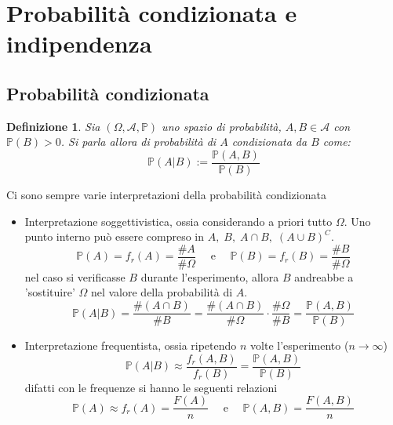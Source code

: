 \documentclass[a4paper,12pt]{article}
\theoremstyle{break}
\newtheorem{definition}{Definizione}[section]
\numberwithin{equation}{section}
\begin{document}
\section{Probabilità condizionata e indipendenza}
\subsection{Probabilità condizionata}
\begin{definition}
  Sia \((\Omega, \mathcal{A}, \mathbb{P})\) uno spazio di probabilità, \(A, B \in \mathcal{A}\) con \(\mathbb{P}(B) > 0\). Si parla allora di probabilità di \(A\) condizionata da \(B\) come: 
  \[
    \mathbb{P}(A|B) := \frac{\mathbb{P}(A,B)}{\mathbb{P}(B)}
  \]
\end{definition}
Ci sono sempre varie interpretazioni della probabilità condizionata
\begin{itemize}
  \item Interpretazione soggettivistica, ossia considerando a priori tutto \(\Omega\). Uno punto interno può essere compreso in \(A, \; B, \; A \cap B, \; (A \cup B)^C\). 
  \[
    \mathbb{P}(A) = f_r (A) = \frac{\# A}{\# \Omega} \quad \mbox{ e } \quad \mathbb{P}(B) = f_r(B) = \frac{\#B}{\#\Omega}
  \]
  nel caso si verificasse \(B\) durante l'esperimento, allora \(B\) andreabbe a 'sostituire' \(\Omega\) nel valore della probabilità di \(A\). 
  \[
    \mathbb{P}(A|B) = \frac{\# (A \cap B)}{\#B} = \frac{\# (A \cap B)}{\#\Omega} \cdot \frac{\# \Omega}{\# B} = \frac{\mathbb{P}(A,B)}{\mathbb{P}(B)}
  \]
  \item Interpretazione frequentista, ossia ripetendo \(n\) volte l'esperimento (\(n \to \infty\))
  \[
    \mathbb{P}(A|B) \approx \frac{f_r(A, B)}{f_r(B)} = \frac{\mathbb{P}(A,B)}{\mathbb{P}(B)}
  \]
  difatti con le frequenze si hanno le seguenti relazioni
  \[\mathbb{P}(A) \approx f_r(A) = \frac{F(A)}{n} \quad \mbox{ e } \quad \mathbb{P}(A,B) = \frac{F(A,B)}{n}\] 
\end{itemize}
\end{document}
